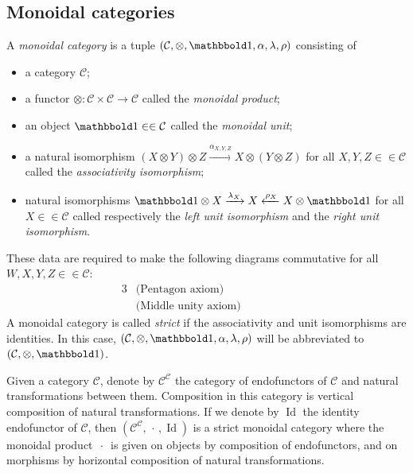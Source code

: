 \documentclass[10pt]{simplearticle}
\newcommand{\tikzinput}[1]{}
\newcommand{\Id}{\operatorname{Id}}
\newcommand{\tensorunit}{\mathbbold1}
\newcommand{\singledot}{\,\cdot\,}
\begin{document}
\subsection{Monoidal categories}
\begin{defn}
A \emph{monoidal category} is a tuple $(\mathcal{C},\otimes,\tensorunit,\alpha,\lambda,\rho)$
consisting of
\begin{itemize}
\item a category $\mathcal{C}$;
\item a functor $\otimes\colon\mathcal{C}\times\mathcal{C}\to\mathcal{C}$
called the \emph{monoidal product};
\item an object $\tensorunit\in\in\mathcal{C}$ called the \emph{monoidal
unit};
\item a natural isomorphism $(X\otimes Y)\otimes Z\xrightarrow{\alpha_{X,Y,Z}}X\otimes(Y\otimes Z)$
for all $X,Y,Z\in\in\mathcal{C}$ called the \emph{associativity isomorphism};
\item natural isomorphisms $\tensorunit\otimes X\xrightarrow{\lambda_{X}}X\xleftarrow{\rho_{X}}X\otimes\tensorunit$
for all $X\in\in\mathcal{C}$ called respectively the \emph{left unit
isomorphism} and the \emph{right unit isomorphism}.
\end{itemize}
These data are required to make the following diagrams commutative
for all $W,X,Y,Z\in\in\mathcal{C}$:
\begin{alignat*}{3}
 & \textrm{(Pentagon axiom)} & \qquad &\ 
& \tikzinput{d325}\\
 & \textrm{(Middle unity axiom)} & \qquad &\ 
& \tikzinput{d324}
\end{alignat*}
A monoidal category is called \emph{strict} if the associativity and
unit isomorphisms are identities. In this case, $(\mathcal{C},\otimes,\tensorunit,\alpha,\lambda,\rho)$
will be abbreviated to $(\mathcal{C},\otimes,\tensorunit)$.
\end{defn}

\begin{example}\label{exa:str-moncat}
Given
a category $\mathcal{C}$,
denote by $\mathcal{C}^{\mathcal{C}}$ the category of endofunctors
of $\mathcal{C}$ and natural transformations between them. Composition
in this category is vertical composition of natural transformations.
If we denote by $\Id$ the identity endofunctor of $\mathcal{C}$,
then $(\mathcal{C}^{\mathcal{C}},\singledot,\Id)$ is a strict monoidal
category where the monoidal product $\singledot$ is given on objects
by composition of endofunctors, and on morphisms by horizontal composition
of natural transformations.
\end{example}
\end{document}
